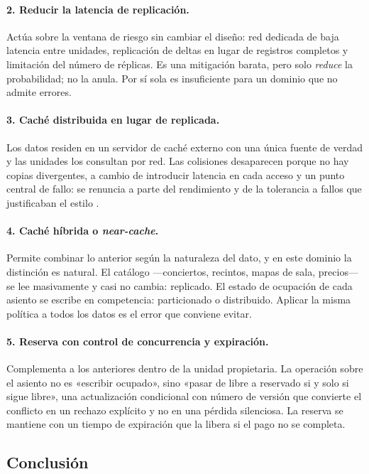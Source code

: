 \paragraph{2. Reducir la latencia de replicación.} Actúa sobre la ventana de riesgo sin cambiar el diseño: red dedicada de baja latencia entre unidades, replicación de deltas en lugar de registros completos y limitación del número de réplicas. Es una mitigación barata, pero solo \emph{reduce} la probabilidad; no la anula. Por sí sola es insuficiente para un dominio que no admite errores.

\paragraph{3. Caché distribuida en lugar de replicada.} Los datos residen en un servidor de caché externo con una única fuente de verdad y las unidades los consultan por red. Las colisiones desaparecen porque no hay copias divergentes, a cambio de introducir latencia en cada acceso y un punto central de fallo: se renuncia a parte del rendimiento y de la tolerancia a fallos que justificaban el estilo \parencite{richardsford2020}.

\paragraph{4. Caché híbrida o \emph{near-cache}.} Permite combinar lo anterior según la naturaleza del dato, y en este dominio la distinción es natural. El catálogo ---conciertos, recintos, mapas de sala, precios--- se lee masivamente y casi no cambia: replicado. El estado de ocupación de cada asiento se escribe en competencia: particionado o distribuido. Aplicar la misma política a todos los datos es el error que conviene evitar.

\paragraph{5. Reserva con control de concurrencia y expiración.} Complementa a los anteriores dentro de la unidad propietaria. La operación sobre el asiento no es «escribir ocupado», sino «pasar de libre a reservado si y solo si sigue libre», una actualización condicional con número de versión que convierte el conflicto en un rechazo explícito y no en una pérdida silenciosa. La reserva se mantiene con un tiempo de expiración que la libera si el pago no se completa.

\subsection{Conclusión}

